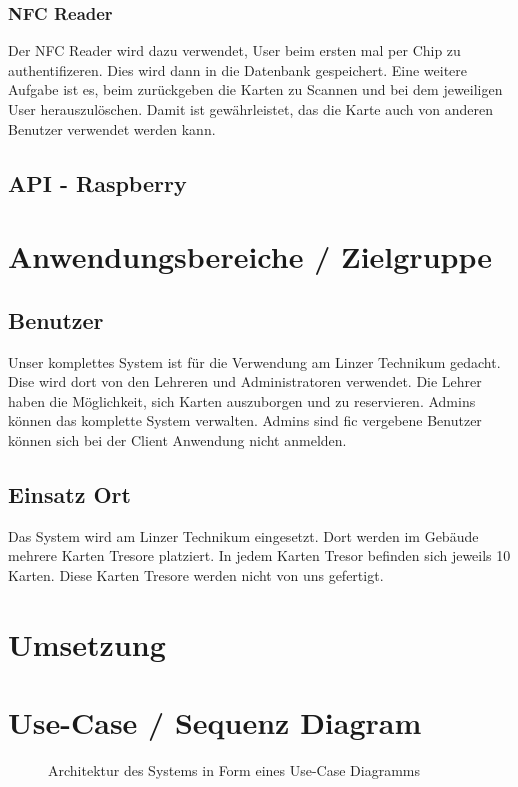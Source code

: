 \documentclass[a4paper]{article}
\begin{document}
\subsubsection{NFC Reader}
Der NFC Reader wird dazu verwendet, User beim ersten mal per Chip zu authentifizeren. Dies wird dann in die Datenbank gespeichert. Eine weitere Aufgabe ist es, beim zurückgeben die Karten zu Scannen und bei dem jeweiligen User herauszulöschen. Damit ist gewährleistet, das die Karte auch von anderen Benutzer verwendet werden kann.

\newpage
\subsection{API - Raspberry}

\newpage
\section{Anwendungsbereiche / Zielgruppe}
\subsection{Benutzer}
Unser komplettes System ist für die Verwendung am Linzer Technikum gedacht. Dise wird dort von den Lehreren und Administratoren verwendet. Die Lehrer haben die Möglichkeit, sich Karten auszuborgen und zu reservieren. Admins können das komplette System verwalten. Admins sind fic vergebene Benutzer können sich bei der Client Anwendung nicht anmelden.


\subsection{Einsatz Ort}
Das System wird am Linzer Technikum eingesetzt. Dort werden im Gebäude mehrere Karten Tresore platziert. In jedem Karten Tresor befinden sich jeweils 10 Karten. Diese Karten Tresore werden nicht von uns gefertigt.


\newpage

\section{Umsetzung}

\newpage
\section{Use-Case / Sequenz Diagram}
\begin{figure}[htbp]
  \centering
   
  \caption{Architektur des Systems in Form eines Use-Case Diagramms}
  \label{architecture}
\end{figure}

\listoffigures
\end{document}
